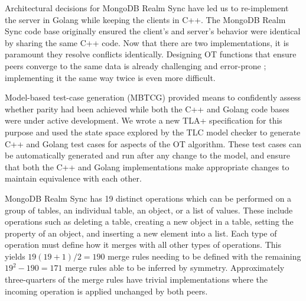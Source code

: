 \documentclass{vldb}
\begin{document}
Architectural decisions for MongoDB Realm Sync have led us to re-implement the server in Golang while keeping the clients in C++. The MongoDB Realm Sync code base originally ensured the client's and server's behavior were identical by sharing the same C++ code. Now that there are two implementations, it is paramount they resolve conflicts identically. Designing OT functions that ensure peers converge to the same data is already challenging and error-prone \cite{Imine03ProvingCorrectnessOfTransformationFunctions, Imine06FormalDesignAndVerificationOfOT, Randolph13OnConsistencyofOTApproach}; implementing it the same way twice is even more difficult.

Model-based test-case generation (MBTCG) \cite{Gravell11ConcurrentDevelopmentOfModelAndImplementation} provided means to confidently assess whether parity had been achieved while both the C++ and Golang code bases were under active development. We wrote a new TLA+ specification for this purpose and used the state space explored by the TLC model checker to generate C++ and Golang test cases for aspects of the OT algorithm. These test cases can be automatically generated and run after any change to the model, and ensure that both the C++ and Golang implementations make appropriate changes to maintain equivalence with each other.


MongoDB Realm Sync has 19 distinct operations which can be performed on a group of tables, an individual table, an object, or a list of values. These include operations such as deleting a table, creating a new object in a table, setting the property of an object, and inserting a new element into a list. Each type of operation must define how it merges with all other types of operations. This yields $19 (19 + 1) / 2 = 190$ merge rules needing to be defined with the remaining $19^2 - 190 = 171$ merge rules able to be inferred by symmetry. Approximately three-quarters of the merge rules have trivial implementations where the incoming operation is applied unchanged by both peers.
\end{document}
